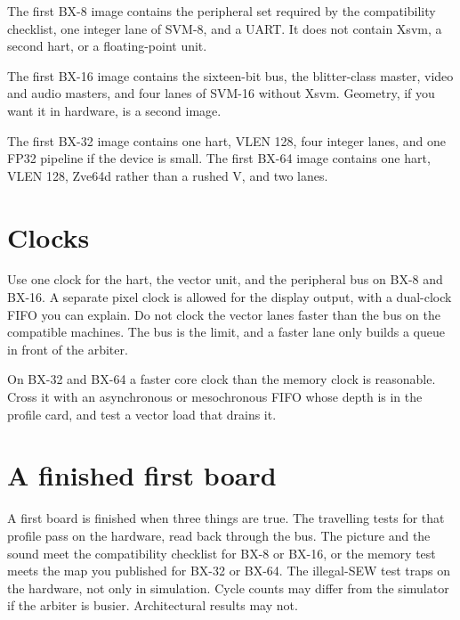 The first BX-8 image contains the peripheral set required by the compatibility checklist, one integer lane of SVM-8, and a UART. It does not contain Xsvm, a second hart, or a floating-point unit.

The first BX-16 image contains the sixteen-bit bus, the blitter-class master, video and audio masters, and four lanes of SVM-16 without Xsvm. Geometry, if you want it in hardware, is a second image.

The first BX-32 image contains one hart, VLEN 128, four integer lanes, and one FP32 pipeline if the device is small. The first BX-64 image contains one hart, VLEN 128, Zve64d rather than a rushed V, and two lanes.

\section{Clocks}

Use one clock for the hart, the vector unit, and the peripheral bus on BX-8 and BX-16. A separate pixel clock is allowed for the display output, with a dual-clock FIFO you can explain. Do not clock the vector lanes faster than the bus on the compatible machines. The bus is the limit, and a faster lane only builds a queue in front of the arbiter.

On BX-32 and BX-64 a faster core clock than the memory clock is reasonable. Cross it with an asynchronous or mesochronous FIFO whose depth is in the profile card, and test a vector load that drains it.

\section{A finished first board}

A first board is finished when three things are true. The travelling tests for that profile pass on the hardware, read back through the bus. The picture and the sound meet the compatibility checklist for BX-8 or BX-16, or the memory test meets the map you published for BX-32 or BX-64. The illegal-SEW test traps on the hardware, not only in simulation. Cycle counts may differ from the simulator if the arbiter is busier. Architectural results may not.
